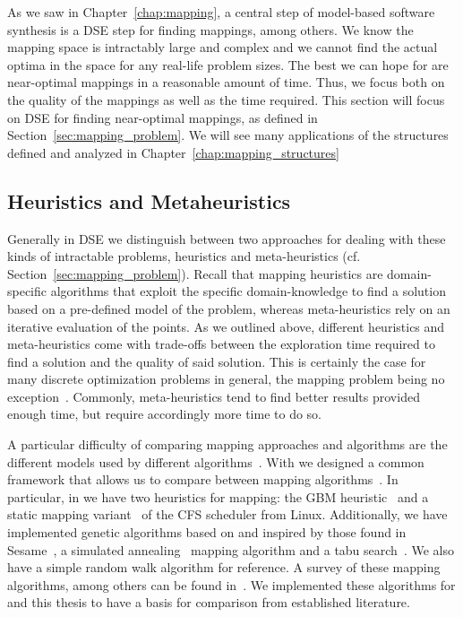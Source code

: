 As we saw in Chapter~\ref{chap:mapping}, a central step of model-based software synthesis is a \ac{DSE} step for finding mappings, among others.
We know the mapping space is intractably large and complex and we cannot find the actual optima in the space for any real-life problem sizes.
The best we can hope for are near-optimal mappings in a reasonable amount of time.
Thus, we focus both on the quality of the mappings as well as the time required.
This section will focus on \ac{DSE} for finding near-optimal mappings, as defined in Section~\ref{sec:mapping_problem}. 
We will see many applications of the structures defined and analyzed in Chapter~\ref{chap:mapping_structures}

\subsection{Heuristics and Metaheuristics}
\label{sec:heuristics_vs_metaheuristics}

Generally in \ac{DSE} we distinguish between two approaches for dealing with these kinds of intractable problems, heuristics and meta-heuristics (cf. Section~\ref{sec:mapping_problem}).
Recall that mapping heuristics are domain-specific algorithms that exploit the specific domain-knowledge to find a solution based on a pre-defined model of the problem, whereas meta-heuristics rely on an iterative evaluation of the points.
As we outlined above, different heuristics and meta-heuristics come with trade-offs between the exploration time required to find a solution and the quality of said solution.
This is certainly the case for many discrete optimization problems in general, the mapping problem being no exception~\cite{goens_mcsoc16}.
Commonly, meta-heuristics tend to find better results provided enough time, but require accordingly more time to do so.

A particular difficulty of comparing mapping approaches and algorithms are the different models used by different algorithms~\cite{goens_mcsoc16}.
With \mocasin we designed a common framework that allows us to compare between mapping algorithms~\cite{menard_rapido21}.
In particular, in \mocasin we have two heuristics for mapping: the \ac{GBM} heuristic~\cite{castrillon_dac12} and a static mapping variant~\cite{menard_rapido21} of the \ac{CFS} scheduler from Linux.
Additionally, we have implemented genetic algorithms based on and inspired by those found in Sesame~\cite{erbas2006multiobjective,quan2014towards,goens_mcsoc16}, a simulated annealing~\cite{simulated_annealing} mapping algorithm and a tabu search~\cite{tabu_search}.
We also have a simple random walk algorithm for reference.
A survey of these mapping algorithms, among others can be found in~\cite{singh2013mapping}.
We implemented these algorithms for \mocasin and this thesis to have a basis for comparison from established literature.


